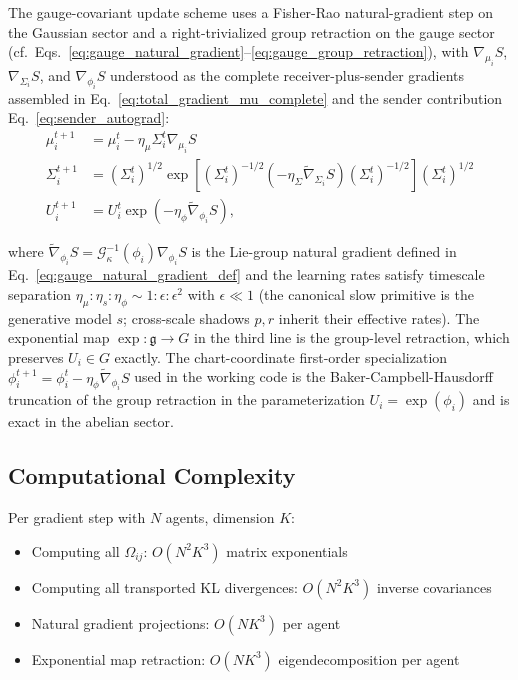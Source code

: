 \documentclass[11pt]{article}
\begin{document}
The gauge-covariant update scheme uses a Fisher-Rao natural-gradient step on the Gaussian sector and a right-trivialized group retraction on the gauge sector (cf.\ Eqs.~\ref{eq:gauge_natural_gradient}--\ref{eq:gauge_group_retraction}), with $\nabla_{\mu_i} S$, $\nabla_{\Sigma_i} S$, and $\nabla_{\phi_i} S$ understood as the complete receiver-plus-sender gradients assembled in Eq.~\eqref{eq:total_gradient_mu_complete} and the sender contribution Eq.~\eqref{eq:sender_autograd}:
\begin{align}
\mu_i^{t+1} &= \mu_i^t - \eta_\mu \Sigma_i^t \nabla_{\mu_i} S \\
\Sigma_i^{t+1} &= \left(\Sigma_i^t\right)^{1/2} \exp\left[\left(\Sigma_i^t\right)^{-1/2}\left(-\eta_\Sigma \tilde{\nabla}_{\Sigma_i} S\right)\left(\Sigma_i^t\right)^{-1/2}\right] \left(\Sigma_i^t\right)^{1/2} \\
U_i^{t+1} &= U_i^t \exp\left(-\eta_\phi \tilde{\nabla}_{\phi_i} S\right),
\end{align}

where $\tilde{\nabla}_{\phi_i} S = \mathcal{G}_\kappa^{-1}(\phi_i)\nabla_{\phi_i} S$ is the Lie-group natural gradient defined in Eq.~\ref{eq:gauge_natural_gradient_def} and the learning rates satisfy timescale separation $\eta_\mu : \eta_s : \eta_\phi \sim 1 : \epsilon : \epsilon^2$ with $\epsilon \ll 1$ (the canonical slow primitive is the generative model $s$; cross-scale shadows $p, r$ inherit their effective rates). The exponential map $\exp : \mathfrak{g} \to G$ in the third line is the group-level retraction, which preserves $U_i \in G$ exactly. The chart-coordinate first-order specialization $\phi_i^{t+1} = \phi_i^t - \eta_\phi \tilde{\nabla}_{\phi_i} S$ used in the working code is the Baker-Campbell-Hausdorff truncation of the group retraction in the parameterization $U_i = \exp(\phi_i)$ and is exact in the abelian sector.

\subsection*{Computational Complexity}

Per gradient step with $N$ agents, dimension $K$:
\begin{itemize}
\item Computing all $\Omega_{ij}$: $O(N^2 K^3)$ matrix exponentials
\item Computing all transported KL divergences: $O(N^2 K^3)$ inverse covariances
\item Natural gradient projections: $O(NK^3)$ per agent
\item Exponential map retraction: $O(NK^3)$ eigendecomposition per agent
\end{itemize}
\end{document}
